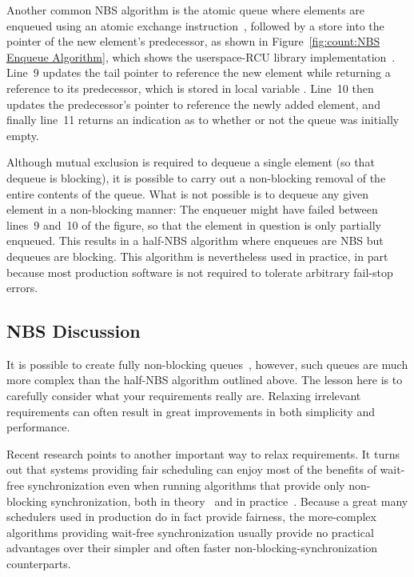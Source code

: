 Another common NBS algorithm is the atomic queue where elements are
enqueued using an atomic exchange instruction~\cite{MagedMichael1993JPDC},
followed by a store into the  pointer of the new element's
predecessor, as shown in
Figure~\ref{fig:count:NBS Enqueue Algorithm},
which shows the userspace-RCU library
implementation~\cite{MathieuDesnoyers2009URCU}.
Line~9 updates the tail pointer to reference the new element while
returning a reference to its predecessor, which is stored in
local variable .
Line~10 then updates the predecessor's  pointer to
reference the newly added element, and finally line~11
returns an indication as to whether or not the queue was initially
empty.

Although mutual exclusion is required to dequeue a single element
(so that dequeue is blocking), it is possible to carry out a non-blocking
removal of the entire contents of the queue.
What is not possible is to dequeue any given element in a non-blocking
manner: The enqueuer might have failed between lines~9 and~10 of the
figure, so that the element in question is only partially enqueued.
This results in a half-NBS algorithm where enqueues are NBS but
dequeues are blocking.
This algorithm is nevertheless used in practice, in part because
most production software is not required to tolerate arbitrary fail-stop
errors.

\subsection{NBS Discussion}
\label{sec:advsync:NBS Discussion}

It is possible to create fully non-blocking queues~\cite{MichaelScott96},
however, such queues are much more complex than the half-NBS algorithm
outlined above.
The lesson here is to carefully consider what your requirements really are.
Relaxing irrelevant requirements can often result in great
improvements in both simplicity and performance.

Recent research points to another important way to relax requirements.
It turns out that systems providing fair scheduling can enjoy most
of the benefits of wait-free synchronization even when running
algorithms that provide only non-blocking
synchronization, both in theory~\cite{DanAlitarh2013PracticalProgress}
and in practice~\cite{SamyAlBahra2013NBS}.
Because a great many schedulers used in production do in fact
provide fairness,
the more-complex algorithms providing wait-free synchronization
usually provide no practical advantages over their simpler
and often faster non-blocking-synchronization counterparts.

